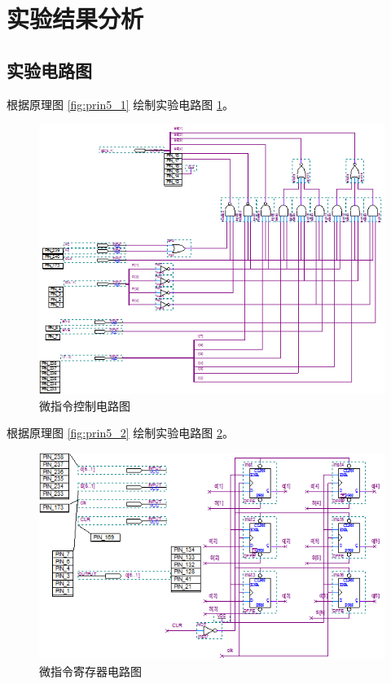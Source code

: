 \section{实验结果分析}

\subsection{实验电路图}

根据原理图 \ref{fig:prin5_1} 绘制实验电路图 \ref{fig:bdf5_1}。

\begin{figure}[H]
\centering
\includegraphics[width=\textwidth]{images/bdf5_1.png}
\caption{微指令控制电路图}
\label{fig:bdf5_1}
\end{figure}

根据原理图 \ref{fig:prin5_2} 绘制实验电路图 \ref{fig:bdf5_2}。

\begin{figure}[H]
\centering
\includegraphics[width=\textwidth]{images/bdf5_2.png}
\caption{微指令寄存器电路图}
\label{fig:bdf5_2}
\end{figure}

